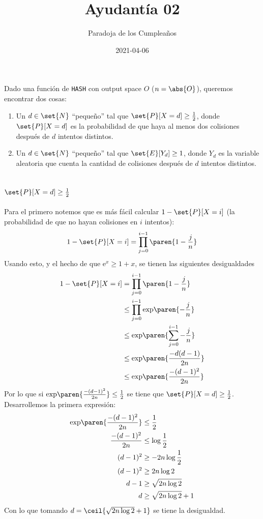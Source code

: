 \documentclass{ayudantia}
\title{Ayudantía 02}
\subtitle{Paradoja de los Cumpleaños}
\date{2021-04-06}
\begin{document}
\maketitle

Dado una función de \texttt{HASH} con output space \(O\) (\(n=\abs{O}\)), queremos encontrar dos cosas:
\begin{enumerate}
    \item Un \(d\in\set{N}\) ``pequeño'' tal que \(\set{P}[X=d]\geq\frac12\), donde \(\set{P}[X=d]\) es la probabilidad de que haya al menos dos colisiones después de \(d\) intentos distintos.
    \item Un \(d\in\set{N}\) ``pequeño'' tal que \(\set{E}[Y_d]\geq1\), donde \(Y_d\) es la variable aleatoria que cuenta la cantidad de colisiones  después de \(d\) intentos distintos.
\end{enumerate}

\section*{\(\set{P}[X=d]\geq\frac12\)}
Para el primero notemos que es más fácil calcular \(1-\set{P}[X=i]\) (la probabilidad de que no hayan colisiones en \(i\) intentos):
\begin{equation*}
    1-\set{P}[X=i]=\prod_{j=0}^{i-1}\paren{1-\frac{j}{n}}
\end{equation*}
Usando esto, y el hecho de que \(\mathrm{e}^x\geq1+x\), se tienen las siguientes desigualdades
\begin{align*}
    1-\set{P}[X=i]&=\prod_{j=0}^{i-1}\paren{1-\frac{j}{n}}\\
    &\leq\prod_{j=0}^{i-1}\text{exp}\paren{-\frac{j}{n}}\\
    &\leq\text{exp}\paren{\sum_{j=0}^{i-1}-\frac{j}{n}}\\
    &\leq\text{exp}\paren{\frac{-d(d-1)}{2n}}\\
    &\leq\text{exp}\paren{\frac{-(d-1)^2}{2n}}\\
\end{align*}
Por lo que si \(\text{exp}\paren{\frac{-(d-1)^2}{2n}}\leq\frac12\) se tiene que \(\set{P}[X=d]\geq\frac12\). Desarrollemos la primera expresión:
\begin{align*}
    \text{exp}\paren{\frac{-(d-1)^2}{2n}}&\leq\frac12\\
    \frac{-(d-1)^2}{2n}&\leq\log\frac12\\
    (d-1)^2&\geq-2n\log\frac12\\
    (d-1)^2&\geq2n\log2\\
    d-1&\geq\sqrt{2n\log2}\\
    d&\geq\sqrt{2n\log2}+1\\
\end{align*}
Con lo que tomando \(d=\ceil{\sqrt{2n\log2}+1}\) se tiene la desigualdad.
\end{document}
